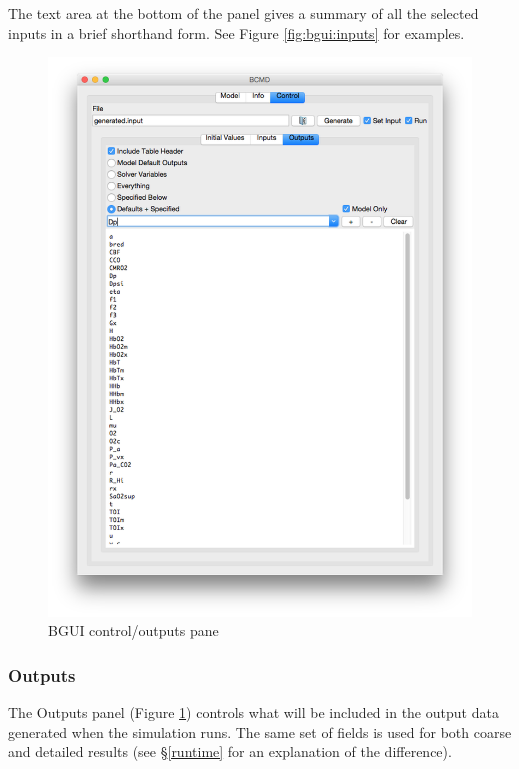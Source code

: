 \documentclass[a4paper,11pt]{article}
\begin{document}
The text area at the bottom of the panel gives a summary of all the selected inputs in a brief shorthand form. See Figure \ref{fig:bgui:inputs} for examples.

\begin{figure}[tbph]
\begin{center}
\includegraphics[scale=0.5]{figures/outputs.png}
\caption{BGUI control/outputs pane}
\label{fig:bgui:outputs}
\end{center}
\end{figure}

\subsubsection{Outputs}\label{bgui:outputs}

The Outputs panel (Figure \ref{fig:bgui:outputs}) controls what will be included in the output data generated when the simulation runs. The same set of fields is used for both coarse and detailed results (see \S\ref{runtime} for an explanation of the difference).
\end{document}
